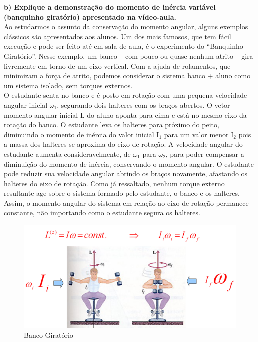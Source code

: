 \textbf{b) Explique a demonstração do momento de inércia variável (banquinho giratório) apresentado na vídeo-aula.}\\

Ao estudarmos o assunto da conservação do momento angular, alguns exemplos clássicos são apresentados aos alunos. Um dos mais famosos, que tem fácil execução e pode ser feito até em sala de aula, é o experimento do “Banquinho Giratório”. Nesse exemplo, um banco – com pouco ou quase nenhum atrito – gira livremente em torno de um eixo vertical. Com a ajuda de rolamentos, que minimizam a força de atrito, podemos considerar o sistema banco + aluno como um sistema isolado, sem torques externos.\\

O estudante senta no banco e é posto em rotação com uma pequena velocidade angular inicial $\omega _1$, segurando dois halteres com os braços abertos. O vetor momento angular inicial L do aluno aponta para cima e está no mesmo eixo da rotação do banco. O estudante leva os halteres para próximo do peito, diminuindo o momento de inércia do valor inicial I$_1$ para um valor menor I$_2$ pois a massa dos halteres se aproxima do eixo de rotação. A velocidade angular do estudante aumenta consideravelmente, de $\omega _1$ para $\omega _2$, para poder compensar a diminuição do momento de inércia, conservando o momento angular. O estudante pode reduzir sua velocidade angular abrindo os braços novamente, afastando os halteres do eixo de rotação. Como já ressaltado, nenhum torque externo resultante age sobre o sistema formado pelo estudante, o banco e os halteres. Assim, o momento angular do sistema em relação ao eixo de rotação permanece constante, não importando como o estudante segura os halteres.

\begin{figure}[H]
  \centering
  \includegraphics[scale=1.3]{images/i4.png}
  \caption{Banco Giratório}
\end{figure}

